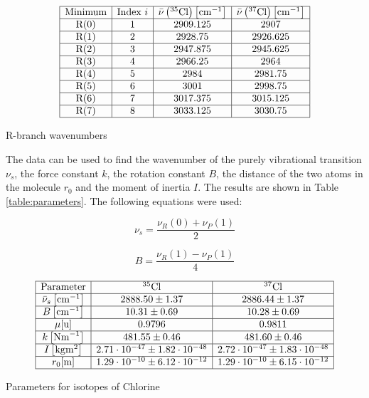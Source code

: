 \documentclass{article}
\begin{document}
\begin{table}[H]
    \centering
    \[
    \begin{array}{|c|c|c|c|}
    \hline \text{Minimum} & \text{Index } i & \bar{\nu}\left({ }^{35} \mathrm{Cl}\right)\left[\mathrm{cm}^{-1}\right] & \bar{\nu}\left({ }^{37} \mathrm{Cl}\right)\left[\mathrm{cm}^{-1}\right] \\
    \hline \text{R(0)} & 1 & 2909.125 & 2907 \\
    \hline \text{R(1)} & 2 & 2928.75 & 2926.625 \\
    \hline \text{R(2)} & 3 & 2947.875 & 2945.625 \\
    \hline \text{R(3)} & 4 & 2966.25 & 2964 \\
    \hline \text{R(4)} & 5 & 2984 & 2981.75 \\
    \hline \text{R(5)} & 6 & 3001 & 2998.75 \\
    \hline \text{R(6)} & 7 & 3017.375 & 3015.125 \\
    \hline \text{R(7)} & 8 & 3033.125 & 3030.75 \\
    \hline
    \end{array}
    \]
    \caption{R-branch wavenumbers}
    \label{table:wavenumbersR}
\end{table}

The data can be used to find the wavenumber of the purely vibrational transition $\nu_s$, the force constant $k$, the rotation constant $B$, the distance of the two atoms in the molecule $r_0$ and the moment of inertia $I$. The results are shown in Table \ref{table:parameters}. The following equations were used:

\begin{equation}
	\nu_s = \frac{\nu_R(0) + \nu_P(1)}{2}
\end{equation}

\begin{equation}
	B = \frac{\nu_R(1) - \nu_P(1)}{4}
\end{equation}

\begin{table}[H]
    \centering
    \[
    \begin{array}{|c|c|c|}
    \hline \text{Parameter} & { }^{35} \mathrm{Cl} & { }^{37} \mathrm{Cl} \\
    \hline \bar{\nu}_s\left[\mathrm{cm}^{-1}\right] & 2888.50 \pm 1.37 & 2886.44 \pm 1.37 \\
    \hline B\left[\mathrm{cm}^{-1}\right] & 10.31 \pm 0.69 & 10.28 \pm 0.69 \\
    \hline \mu[\mathrm{u}] & 0.9796 & 0.9811 \\
    \hline k\left[\mathrm{Nm}^{-1}\right] & 481.55 \pm 0.46 & 481.60 \pm 0.46 \\
    \hline I\left[\mathrm{kg} \mathrm{m}^2\right] & 2.71 \cdot 10^{-47} \pm 1.82 \cdot 10^{-48} & 2.72 \cdot 10^{-47} \pm 1.83 \cdot 10^{-48} \\
    \hline r_0[\mathrm{m}] & 1.29 \cdot 10^{-10} \pm 6.12 \cdot 10^{-12} & 1.29 \cdot 10^{-10} \pm 6.15 \cdot 10^{-12} \\
    \hline
    \end{array}
    \]
    \caption{Parameters for isotopes of Chlorine}
    \label{table:parameters}
\end{table}
\end{document}
